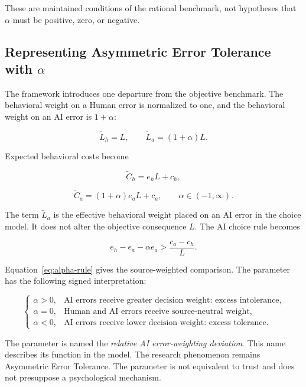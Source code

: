 \documentclass[11pt,a4paper]{article}
\newcommand{\term}[1]{\textit{#1}}
\begin{document}
These are maintained conditions of the rational benchmark, not hypotheses that $\alpha$ must be positive, zero, or negative.

\subsection{\texorpdfstring{Representing Asymmetric Error Tolerance with $\alpha$}{Representing Asymmetric Error Tolerance with alpha}}

The framework introduces one departure from the objective benchmark. The behavioral weight on a Human error is normalized to one, and the behavioral weight on an AI error is $1+\alpha$:

\begin{equation*}
\widetilde L_h=L,\qquad \widetilde L_a=(1+\alpha)L.
\end{equation*}

Expected behavioral costs become

\begin{equation*}
\widetilde C_h=e_hL+c_h,
\end{equation*}

\begin{equation*}
\widetilde C_a=(1+\alpha)e_aL+c_a,
\qquad \alpha\in(-1,\infty).
\end{equation*}

The term $\widetilde L_a$ is the effective behavioral weight placed on an AI error in the choice model. It does not alter the objective consequence $L$. The AI choice rule becomes

\begin{equation}
e_h-e_a-\alpha e_a>\frac{c_a-c_h}{L}.
\label{eq:alpha-rule}
\end{equation}

Equation~\ref{eq:alpha-rule} gives the source-weighted comparison. The parameter has the following signed interpretation:

\begin{equation*}
\begin{cases}
\alpha>0, & \text{AI errors receive greater decision weight: excess intolerance},\\
\alpha=0, & \text{Human and AI errors receive source-neutral weight},\\
\alpha<0, & \text{AI errors receive lower decision weight: excess tolerance}.
\end{cases}
\end{equation*}

The parameter is named the \term{relative AI error-weighting deviation}. This name describes its function in the model. The research phenomenon remains Asymmetric Error Tolerance. The parameter is not equivalent to trust and does not presuppose a psychological mechanism.
\end{document}
